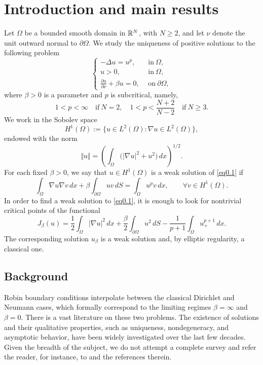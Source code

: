 \documentclass[12pt,reqno]{amsart}
\numberwithin{equation}{section}
\theoremstyle{definition}
\def\R{{\mathfrak R}}
\def\R{\Bbb R}
\begin{document}
\date{}
\maketitle



\section{Introduction and main results}
Let $\Omega$ be a bounded smooth domain in $\R^N$, with $N\ge2$, and let $\nu$ denote the unit outward normal to $\partial\Omega$. We study the uniqueness of positive solutions to the following problem 
\begin{equation}\label{eq0.1}
\begin{cases}
-\Delta u=u^p,\quad &\text{in}\ \Omega,\\
u>0, &\text{in}\ \Omega,\\
\frac{\partial u}{\partial \nu}+\beta u=0, &\text{on}\ \partial \Omega,
\end{cases}
\end{equation}
where $\beta>0$ is a parameter and $p$ is subcritical, namely, 
$$
1<p<\infty \quad \text{if}\ N=2,\quad 1<p<\frac{N+2}{N-2}\quad \text{if}\ N\ge 3.
$$
We work in the Sobolev space
\[
H^1(\Omega):=\{u\in L^2(\Omega): \nabla u\in L^2(\Omega)\},
\]
endowed with the norm
\[
\Vert u\Vert=\left(\int_{\Omega}\bigl(|\nabla u|^2+u^2\bigr)\,dx\right)^{1/2}.
\]
For each fixed $\beta>0$, we say that $u\in H^1(\Omega)$ is a weak solution of \eqref{eq0.1} if
\[
\int_{\Omega}\nabla u\nabla v\,dx+\beta\int_{\partial\Omega}uv\,dS
=\int_{\Omega}u^p v\,dx,
\qquad \forall v\in H^1(\Omega).
\]
In order to find a weak solution to \eqref{eq0.1}, it is enough to look for nontrivial critical points of the functional
\[
J_\beta(u)=\frac12\int_{\Omega}|\nabla u|^2\,dx+\frac{\beta}{2}\int_{\partial\Omega}u^2\,dS
-\frac{1}{p+1}\int_{\Omega}u_+^{p+1}\,dx.
\]
The corresponding solution $u_\beta$ is a weak solution and, by elliptic regularity, a classical one.

\subsection{Background}
Robin boundary conditions interpolate between the classical Dirichlet and Neumann cases, which formally correspond to the limiting regimes $\beta=\infty$ and $\beta=0$. There is a vast literature on these two problems. The existence of solutions and their qualitative properties, such as uniqueness, nondegeneracy, and asymptotic behavior, have been widely investigated over the last few decades. Given the breadth of the subject, we do not attempt a complete survey and refer the reader, for instance, to \cite{AY,BN,BO,GGP,GILY,GNN,GST,W,Z} and the references therein.
\end{document}
